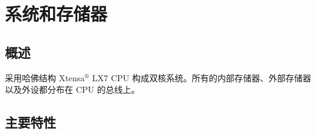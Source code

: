\documentclass[main\_\_CN.tex]{subfiles}
\begin{document}

\ifglobal
\else
    {\let\clearpage\relax \listoftodos}
    \tableofcontents
\fi



\hypertarget{sysmem}{}
\chapter{系统和存储器}
\label{mod:sysmem}

\section{概述}

\chipname{} 采用哈佛结构 Xtensa$^®$ LX7 CPU 构成双核系统。所有的内部存储器、外部存储器以及外设都分布在 CPU 的总线上。

\section{主要特性}
\end{document}
